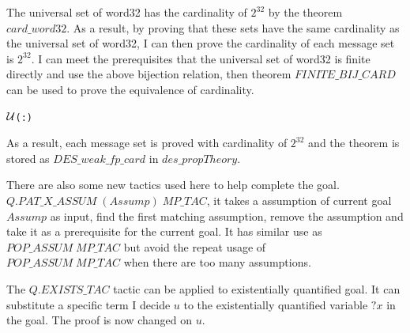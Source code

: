 \documentclass{article}
\begin{document}
The universal set of word32 has the cardinality of $2^{32}$ by the theorem \\
$card\_word32$. As a result, by proving that
these sets have the same cardinality as the universal set of word32, I can then prove the cardinality of each message set
is $2^{32}$. I can meet the prerequisites that the universal set of word32 is finite directly and use the above
bijection relation, then theorem $FINITE\_BIJ\_CARD$ can be used to prove the equivalence of cardinality.

\begin{alltt}
   \HOLTokenTurnstile{}  \ensuremath{{\cal{U}}}(:) \HOLSymConst{=}  \HOLSymConst{\HOLTokenExp{}} 
\end{alltt}

\begin{alltt}
   \HOLTokenTurnstile{}   \HOLSymConst{\HOLTokenConj{}}     \HOLSymConst{\HOLTokenImp{}}   \HOLSymConst{=}  
\end{alltt}

As a result, each message set is proved with cardinality of $2^{32}$ and the theorem is stored as
$DES\_weak\_fp\_card$ in $des\_propTheory$.

\begin{alltt}
   \HOLTokenTurnstile{}    \HOLSymConst{\HOLTokenImp{}}   \HOLSymConst{=}  \HOLSymConst{\HOLTokenExp{}} 
\end{alltt}

There are also some new tactics used here to help complete the goal. \\
$Q.PAT\_X\_ASSUM \; (Assump)\;MP\_TAC $, it takes a
assumption of current goal $Assump$ as input, find the first matching assumption, remove the assumption and take it
as a prerequisite for the current goal. It has similar use as $POP\_ASSUM \; MP\_TAC$ but avoid the repeat usage
of \\
$POP\_ASSUM \; MP\_TAC$ when there are too many assumptions.

The $Q.EXISTS\_TAC$ tactic can be applied to existentially quantified goal. It can substitute a specific term I decide $u$
to the existentially quantified variable $?x$ in the goal. The proof is now changed on $u$.
\end{document}
